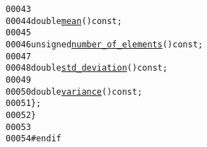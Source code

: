 \begin{footnotesize}
\begin{alltt}
00043 
00044             \textcolor{keywordtype}{double} \hyperlink{structeos_1_1Welford_a4ee0383dc9fc04f9319205ed7c39e6bc}{mean}() \textcolor{keyword}{const};
00045 
00046             \textcolor{keywordtype}{unsigned} \hyperlink{structeos_1_1Welford_a3cbe78c6143406e01dfaff70fac96ecd}{number_of_elements}() \textcolor{keyword}{const};
00047 
00048             \textcolor{keywordtype}{double} \hyperlink{structeos_1_1Welford_af2d5839b48295d51d5d97e4f6cb889ba}{std_deviation}() \textcolor{keyword}{const};
00049 
00050             \textcolor{keywordtype}{double} \hyperlink{structeos_1_1Welford_a08c2dfcf9277822ed83ac7181ec46d6a}{variance}() \textcolor{keyword}{const};
00051     \};
00052 \}
00053 
00054 \textcolor{preprocessor}{#endif}
\end{alltt}\end{footnotesize}
